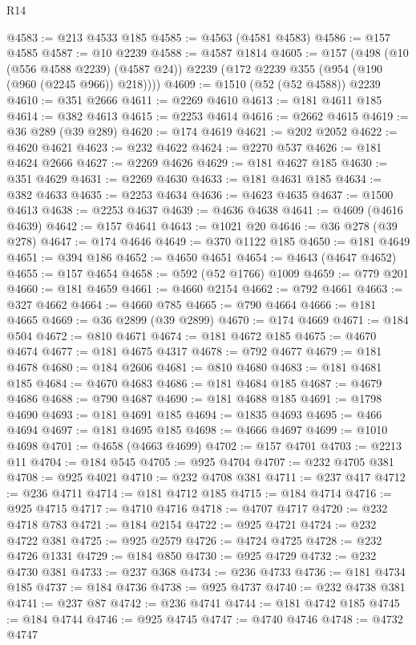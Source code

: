 \begin{lexlean}{R14}
\begin{coremodule}
@4583 := @213 @4533 @185
@4585 := @4563 (@4581 @4583)
@4586 := @157 @4585
@4587 := @10 @2239
@4588 := @4587 @1814
@4605 := @157
    (@498
      (@10 (@556 @4588 @2239) (@4587 @24))
      @2239
      (@172 @2239 @355 (@954 (@190 (@960 (@2245 @966)) @218))))
@4609 := @1510 (@52 (@52 @4588)) @2239
@4610 := @351 @2666
@4611 := @2269 @4610
@4613 := @181 @4611 @185
@4614 := @382 @4613
@4615 := @2253 @4614
@4616 := @2662 @4615
@4619 := @36 @289 (@39 @289)
@4620 := @174 @4619
@4621 := @202 @2052
@4622 := @4620 @4621
@4623 := @232 @4622
@4624 := @2270 @537
@4626 := @181 @4624 @2666
@4627 := @2269 @4626
@4629 := @181 @4627 @185
@4630 := @351 @4629
@4631 := @2269 @4630
@4633 := @181 @4631 @185
@4634 := @382 @4633
@4635 := @2253 @4634
@4636 := @4623 @4635
@4637 := @1500 @4613
@4638 := @2253 @4637
@4639 := @4636 @4638
@4641 := @4609 (@4616 @4639)
@4642 := @157 @4641
@4643 := @1021 @20
@4646 := @36 @278 (@39 @278)
@4647 := @174 @4646
@4649 := @370 @1122 @185
@4650 := @181 @4649
@4651 := @394 @186
@4652 := @4650 @4651
@4654 := @4643 (@4647 @4652)
@4655 := @157 @4654
@4658 := @592 (@52 @1766) @1009
@4659 := @779 @201
@4660 := @181 @4659
@4661 := @4660 @2154
@4662 := @792 @4661
@4663 := @327 @4662
@4664 := @4660 @785
@4665 := @790 @4664
@4666 := @181 @4665
@4669 := @36 @2899 (@39 @2899)
@4670 := @174 @4669
@4671 := @184 @504
@4672 := @810 @4671
@4674 := @181 @4672 @185
@4675 := @4670 @4674
@4677 := @181 @4675 @4317
@4678 := @792 @4677
@4679 := @181 @4678
@4680 := @184 @2606
@4681 := @810 @4680
@4683 := @181 @4681 @185
@4684 := @4670 @4683
@4686 := @181 @4684 @185
@4687 := @4679 @4686
@4688 := @790 @4687
@4690 := @181 @4688 @185
@4691 := @1798 @4690
@4693 := @181 @4691 @185
@4694 := @1835 @4693
@4695 := @466 @4694
@4697 := @181 @4695 @185
@4698 := @4666 @4697
@4699 := @1010 @4698
@4701 := @4658 (@4663 @4699)
@4702 := @157 @4701
@4703 := @2213 @11
@4704 := @184 @545
@4705 := @925 @4704
@4707 := @232 @4705 @381
@4708 := @925 @4021
@4710 := @232 @4708 @381
@4711 := @237 @417
@4712 := @236 @4711
@4714 := @181 @4712 @185
@4715 := @184 @4714
@4716 := @925 @4715
@4717 := @4710 @4716
@4718 := @4707 @4717
@4720 := @232 @4718 @783
@4721 := @184 @2154
@4722 := @925 @4721
@4724 := @232 @4722 @381
@4725 := @925 @2579
@4726 := @4724 @4725
@4728 := @232 @4726 @1331
@4729 := @184 @850
@4730 := @925 @4729
@4732 := @232 @4730 @381
@4733 := @237 @368
@4734 := @236 @4733
@4736 := @181 @4734 @185
@4737 := @184 @4736
@4738 := @925 @4737
@4740 := @232 @4738 @381
@4741 := @237 @87
@4742 := @236 @4741
@4744 := @181 @4742 @185
@4745 := @184 @4744
@4746 := @925 @4745
@4747 := @4740 @4746
@4748 := @4732 @4747

\end{coremodule}
\end{lexlean}
